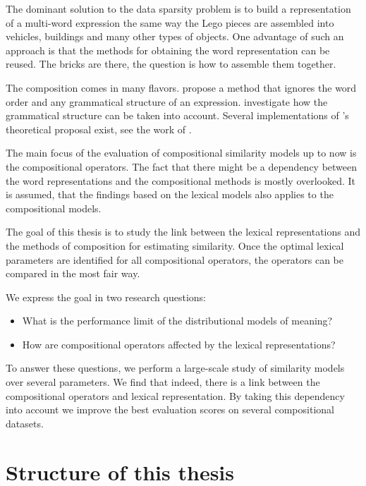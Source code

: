 The dominant solution to the data sparsity problem is to build a representation of a multi-word expression the same way the Lego pieces are assembled into vehicles, buildings and many other types of objects. One advantage of such an approach is that the methods for obtaining the word representation can be reused. The bricks are there, the question is how to assemble them together.

The composition comes in many flavors. \citet{mitchell2010composition} propose a method that ignores the word order and any grammatical structure of an expression. \citet{DBLP:journals/corr/abs-1003-4394,baroni2014frege} investigate how the grammatical structure can be taken into account. Several implementations of \citet{DBLP:journals/corr/abs-1003-4394}'s theoretical proposal exist, see the work of \citet{Grefenstette:2011:ESC:2145432.2145580,Grefenstette:2011:ETV:2140490.2140497,kartsadrqpl2014,fried-polajnar-clark:2015:ACL-IJCNLP}.

The main focus of the evaluation of compositional similarity models up to now is the compositional operators. The fact that there might be a dependency between the word representations and the compositional methods is mostly overlooked. It is assumed, that the findings based on the lexical models also applies to the compositional models.

The goal of this thesis is to study the link between the lexical representations and the methods of composition for estimating similarity. Once the optimal lexical parameters are identified for all compositional operators, the operators can be compared in the most fair way.

We express the goal in two research questions:
\begin{itemize}
\item What is the performance limit of the distributional models of meaning?
\item How are compositional operators affected by the lexical representations?
\end{itemize}

To answer these questions, we perform a large-scale study of similarity models over several parameters. We find that indeed, there is a link between the compositional operators and lexical representation. By taking this dependency into account we improve the best evaluation scores on several compositional datasets.

\section{Structure of this thesis}
\label{sec:structure}

